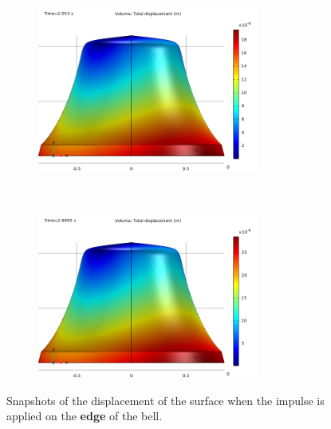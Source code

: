 \documentclass[a4paper]{article}
\begin{document}
\begin{figure}[h!]
	\begin{subfigure}{0.47\textwidth}
		\includegraphics[width=0.8\textwidth]{time domain study edge/middle time.png}
	\end{subfigure}
	~
	\begin{subfigure}{0.47\textwidth}
		\includegraphics[width=0.8\textwidth]{time domain study edge/final time.png}
	\end{subfigure}
	\caption{Snapshots of the displacement of the surface when the impulse is applied on the \textbf{edge} of the bell.}
	\label{fig:timeEdge}
\end{figure}
\end{document}
